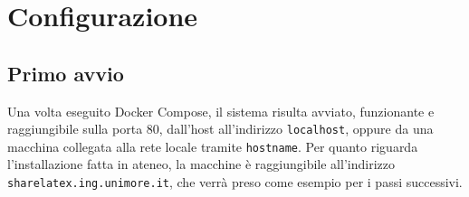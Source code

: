 \chapter{Configurazione}
\label{Configurazione}
\thispagestyle{plain}

\section{Primo avvio}
Una volta eseguito Docker Compose, il sistema risulta avviato, funzionante e raggiungibile sulla porta 80, dall'host all'indirizzo \verb|localhost|, oppure da una macchina collegata alla rete locale tramite \verb|hostname|. Per quanto riguarda l'installazione fatta in ateneo, la macchine è raggiungibile all'indirizzo \verb|sharelatex.ing.unimore.it|, che verrà preso come esempio per i passi successivi.

